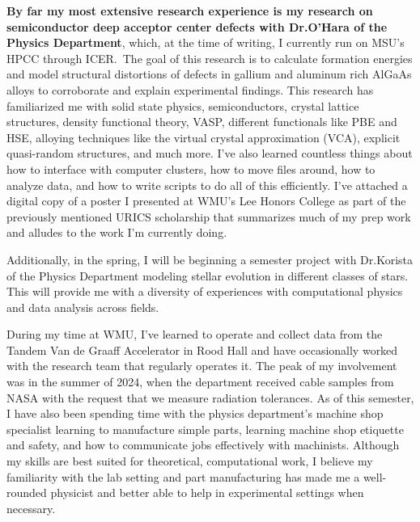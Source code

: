\documentclass[11pt]{article}
\begin{document}
\textbf{By far my most extensive research experience is my research on semiconductor deep acceptor center defects with Dr.\@ O'Hara of the Physics Department}, which, at the time of writing, I currently run on MSU's HPCC through ICER.\ The goal of this research is to calculate formation energies and model structural distortions of defects in gallium and aluminum rich AlGaAs alloys to corroborate and explain experimental findings. This research has familiarized me with solid state physics, semiconductors, crystal lattice structures, density functional theory, VASP, different functionals like PBE and HSE, alloying techniques like the virtual crystal approximation (VCA), explicit quasi-random structures, and much more. I've also learned countless things about how to interface with computer clusters, how to move files around, how to analyze data, and how to write scripts to do all of this efficiently. I've attached a digital copy of a poster I presented at WMU's Lee Honors College as part of the previously mentioned URICS scholarship that summarizes much of my prep work and alludes to the work I'm currently doing.

Additionally, in the spring, I will be beginning a semester project with Dr.\@ Korista of the Physics Department modeling stellar evolution in different classes of stars. This will provide me with a diversity of experiences with computational physics and data analysis across fields.

During my time at WMU, I've learned to operate and collect data from the Tandem Van de Graaff Accelerator in Rood Hall and have occasionally worked with the research team that regularly operates it. The peak of my involvement was in the summer of 2024, when the department received cable samples from NASA with the request that we measure radiation tolerances. As of this semester, I have also been spending time with the physics department's machine shop specialist learning to manufacture simple parts, learning machine shop etiquette and safety, and how to communicate jobs effectively with machinists. Although my skills are best suited for theoretical, computational work, I believe my familiarity with the lab setting and part manufacturing has made me a well-rounded physicist and better able to help in experimental settings when necessary.
\pagebreak

\phantom{}
\vspace{-5em}
\end{document}
